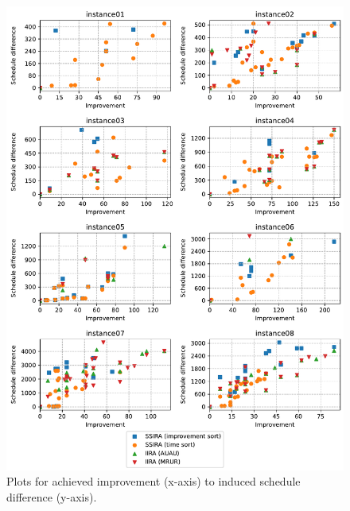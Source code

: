 \begin{figure}[t]
    \centering
    \includegraphics[width=\textwidth]{img/exp_aggregated_improv_diff.pdf}
    \caption{
        Plots for achieved improvement (x-axis) to induced schedule difference (y-axis).
        }
    \label{fig:exp/improv-diff}
\end{figure}

